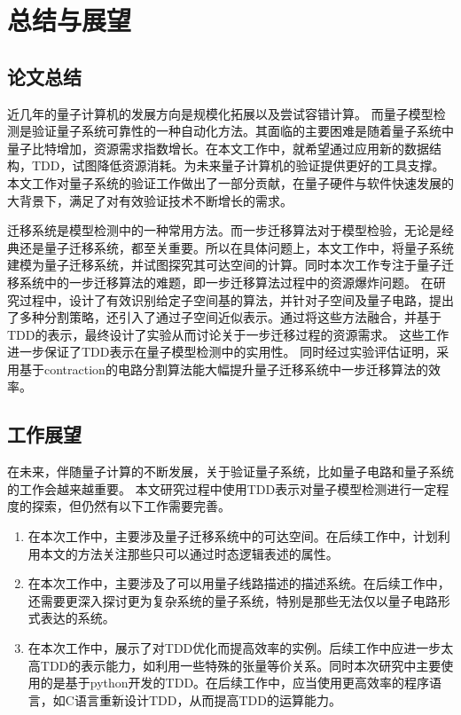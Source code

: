 \chapter{总结与展望}
\section{论文总结}

近几年的量子计算机的发展方向是规模化拓展以及尝试容错计算。
而量子模型检测是验证量子系统可靠性的一种自动化方法。其面临的主要困难是随着量子系统中量子比特增加，资源需求指数增长。在本文工作中，就希望通过应用新的数据结构，TDD，试图降低资源消耗。为未来量子计算机的验证提供更好的工具支撑。
本文工作对量子系统的验证工作做出了一部分贡献，在量子硬件与软件快速发展的大背景下，满足了对有效验证技术不断增长的需求。

迁移系统是模型检测中的一种常用方法。而一步迁移算法对于模型检验，无论是经典还是量子迁移系统，都至关重要。所以在具体问题上，本文工作中，将量子系统建模为量子迁移系统，并试图探究其可达空间的计算。同时本次工作专注于量子迁移系统中的一步迁移算法的难题，即一步迁移算法过程中的资源爆炸问题。
在研究过程中，设计了有效识别给定子空间基的算法，并针对子空间及量子电路，提出了多种分割策略，还引入了通过子空间近似表示。通过将这些方法融合，并基于TDD的表示，最终设计了实验从而讨论关于一步迁移过程的资源需求。
这些工作进一步保证了TDD表示在量子模型检测中的实用性。
同时经过实验评估证明，采用基于contraction的电路分割算法能大幅提升量子迁移系统中一步迁移算法的效率。


\section{工作展望}

在未来，伴随量子计算的不断发展，关于验证量子系统，比如量子电路和量子系统的工作会越来越重要。
本文研究过程中使用TDD表示对量子模型检测进行一定程度的探索，但仍然有以下工作需要完善。
\begin{enumerate}
    \item 在本次工作中，主要涉及量子迁移系统中的可达空间。在后续工作中，计划利用本文的方法关注那些只可以通过时态逻辑表述的属性。
    \item 在本次工作中，主要涉及了可以用量子线路描述的描述系统。在后续工作中，还需要更深入探讨更为复杂系统的量子系统，特别是那些无法仅以量子电路形式表达的系统。
    \item 在本次工作中，展示了对TDD优化而提高效率的实例。后续工作中应进一步太高TDD的表示能力，如利用一些特殊的张量等价关系。同时本次研究中主要使用的是基于python开发的TDD。在后续工作中，应当使用更高效率的程序语言，如C语言重新设计TDD，从而提高TDD的运算能力。
\end{enumerate}

